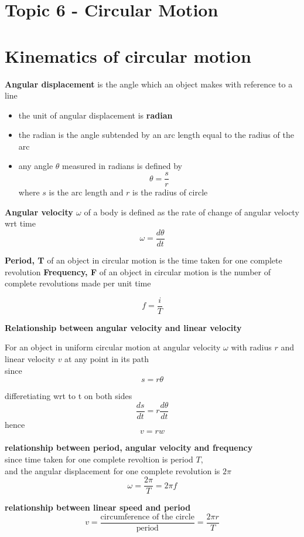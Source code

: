 \documentclass[a4paper, 10pt]{article}
\begin{document}
\section*{Topic 6 - Circular Motion}
\section{Kinematics of circular motion}
\textbf{Angular displacement} is the angle which an object makes with reference to a line
\begin{itemize}
   \item the unit of angular displacement is \textbf{radian}
   \item the radian is the angle subtended by an arc length equal to the radius of the arc 
   \item any angle $\theta$ measured in radians is defined by
      \[
      \theta = \frac{s}{r}
      \]
      where $s$ is the arc length and $r$ is the radius of circle
\end{itemize}	

\textbf{Angular velocity $\omega$ } of a body is defined as the rate of change of angular velocty wrt time
\[
\omega= \frac{d \theta}{dt}
\]

\textbf{Period, T} of an object in circular motion is the time taken for one complete revolution
\textbf{Frequency, F} of an object in circular motion is the number of complete revolutions made per unit time

\[
   f = \frac{i}{T}
\]

\textbf{Relationship between angular velocity and linear velocity}

For an object in uniform circular motion at angular velocity $\omega$ with radius $r$ and linear velocity $v$ at any point in its path \\

since 
\[
s = r \theta
\]

differetiating wrt to t on both sides
\[
\frac{ds}{dt} = r \frac{d\theta}{dt}
\]
hence
\[
v = rw
\]

\textbf{relationship between period, angular velocity and frequency} \\
since time taken for one complete revoltion is period $T$, \\
and the angular displacement for one complete revolution is $2\pi$ 
\[
\omega = \frac{2\pi}{T} = 2 \pi f 
\]

\textbf{relationship between linear speed and period}
\[
   v = \frac{\text{circumference of the circle}}{\text{period}} = \frac{2\pi r}{T}
\]
\end{document}
